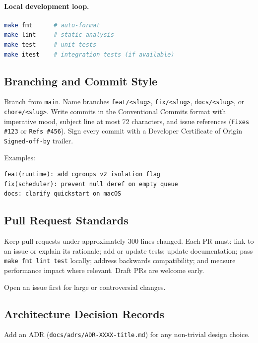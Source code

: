 \paragraph{Local development loop.}
\begin{lstlisting}[language=bash]
make fmt      # auto-format
make lint     # static analysis
make test     # unit tests
make itest    # integration tests (if available)
\end{lstlisting}

\subsection{Branching and Commit Style}

Branch from \texttt{main}. Name branches \texttt{feat/<slug>}, \texttt{fix/<slug>},
\texttt{docs/<slug>}, or \texttt{chore/<slug>}. Write commits in the Conventional
Commits format with imperative mood, subject line at most 72 characters, and issue
references (\texttt{Fixes \#123} or \texttt{Refs \#456}). Sign every commit with a
Developer Certificate of Origin \texttt{Signed-off-by} trailer.

Examples:
\begin{lstlisting}
feat(runtime): add cgroups v2 isolation flag
fix(scheduler): prevent null deref on empty queue
docs: clarify quickstart on macOS
\end{lstlisting}

\subsection{Pull Request Standards}

Keep pull requests under approximately 300 lines changed. Each PR must: link to an
issue or explain its rationale; add or update tests; update documentation; pass
\texttt{make fmt lint test} locally; address backwards compatibility; and measure
performance impact where relevant. Draft PRs are welcome early.

Open an issue first for large or controversial changes.

\subsection{Architecture Decision Records}

Add an ADR (\texttt{docs/adrs/ADR-XXXX-title.md}) for any non-trivial design choice.


